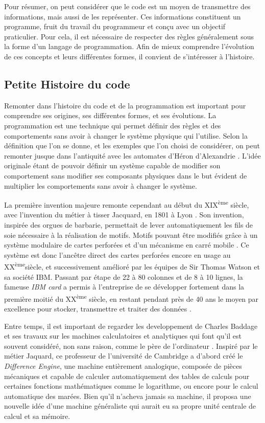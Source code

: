 \documentclass[12pt]{article} %
\newcommand{\ts}{\textsuperscript} %
\begin{document}
Pour résumer, on peut considérer que le code est un moyen de transmettre des informations, mais aussi de les représenter. Ces informations constituent un programme, fruit du travail du programmeur et conçu avec un objectif praticulier. Pour cela, il est nécessaire de respecter des règles généralement sous la forme d'un langage de programmation. Afin de mieux comprendre l'évolution de ces concepts et leurs différentes formes, il convient de s'intéresser à l'histoire.

\subsection{Petite Histoire du code}
Remonter dans l'histoire du code et de la programmation est important pour comprendre ses origines, ses différentes formes, et ses évolutions. La programmation est une technique qui permet définir des règles et des comportements sans avoir à changer le système physique qui l'utilise. Selon la définition que l'on se donne, et les exemples que l'on choisi de considérer, on peut remonter jusque dans l'antiquité avec les automates d'Héron d'Alexandrie \cite{View_all_of_Hansels_posts2018-uw}. L'idée originale étant de pouvoir définir un système capable de modifier son comportement sans modifier ses composants physiques dans le but évident de multiplier les comportements sans avoir à changer le système.

La première invention majeure remonte cependant au début du XIX\ts{ème} siècle, avec l'invention du métier à tisser Jacquard, en 1801 à Lyon \cite{RDigest1982}. Son invention, inspirée des orgues de barbarie, permettait de lever automatiquement les fils de soie nécessaire à la réalisation de motifs. Motifs pouvant être modifiés grâce à un système modulaire de cartes perforées et d'un mécanisme en carré mobile \cite{noauthor_2009-bf}. Ce système est donc l'ancêtre direct des cartes perforées encore en usage au XX\ts{ème}siècle, et successivement amélioré par les équipes de Sir Thomas Watson et sa société IBM. Passant par étape de 22 à 80 colonnes et de 8 à 10 lignes, la fameuse \textit{IBM card} a permis à l'entreprise de se développer fortement dans la première moitié du XX\ts{ème} siècle, en restant pendant près de 40 ans le moyen par excellence pour stocker, transmettre et traiter des données \cite{noauthor_2012-xq}.

Entre temps, il est important de regarder les developpement de Charles Baddage et ses travaux sur les machines calculatoires et analytiques qui font qu'il est souvent considéré, non sans raison, comme le père de l'ordinateur \cite{Copeland2020-my}. Inspiré par le métier Jaquard, ce professeur de l'université de Cambridge a d'abord créé le \textit{Difference Engine}, une machine entièrement analogique, composée de pièces mécaniques et capable de calculer automatiquement des tables de calculs pour certaines fonctions mathématiques comme le logarithme, ou encore pour le calcul automatique des marées. Bien qu'il n'acheva jamais sa machine, il proposa une nouvelle idée d'une machine généraliste qui aurait eu sa propre unité centrale de calcul et sa mémoire. 
\end{document}
